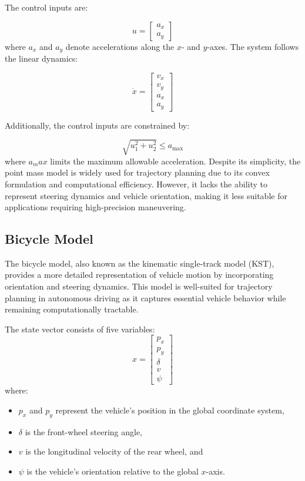 The control inputs are:

\begin{equation}
	u = \begin{bmatrix} a_x \\ a_y \end{bmatrix}
	\label{eq:controls_pm}
\end{equation}
where $a_x$ and $a_y$ denote accelerations along the $x$- and $y$-axes.
The system follows the linear dynamics:

\begin{equation}
	\dot{x} = \begin{bmatrix}
		v_x \\
		v_y \\
		a_x \\
		a_y
	\end{bmatrix}
\end{equation}

Additionally, the control inputs are constrained by:

\begin{equation}
	\sqrt{u_1^2 + u_2^2} \leq a_{\max}
\end{equation}
where $a_max$ limits the maximum allowable acceleration.
Despite its simplicity, the point mass model is widely used for trajectory planning due to its convex formulation and computational efficiency.
However, it lacks the ability to represent steering dynamics and vehicle orientation, making it less suitable for applications requiring
high-precision maneuvering.

\subsection{Bicycle Model} \label{subsec:bicycle_model}

The bicycle model, also known as the kinematic single-track model (KST), provides a more detailed representation of vehicle motion by incorporating
orientation and steering dynamics.
This model is well-suited for trajectory planning in autonomous driving as it captures essential vehicle behavior while remaining computationally
tractable.

The state vector consists of five variables:
\begin{equation}
	x = \begin{bmatrix} p_x \\ p_y \\ \delta \\ v \\ \psi \end{bmatrix}
	\label{eq:states_kst}
\end{equation}
where:
\begin{itemize}
	\item $p_x$ and $p_y$ represent the vehicle's position in the global coordinate system,
	\item $\delta$ is the front-wheel steering angle,
	\item $v$ is the longitudinal velocity of the rear wheel, and
	\item $\psi$ is the vehicle's orientation relative to the global $x$-axis.
\end{itemize}

